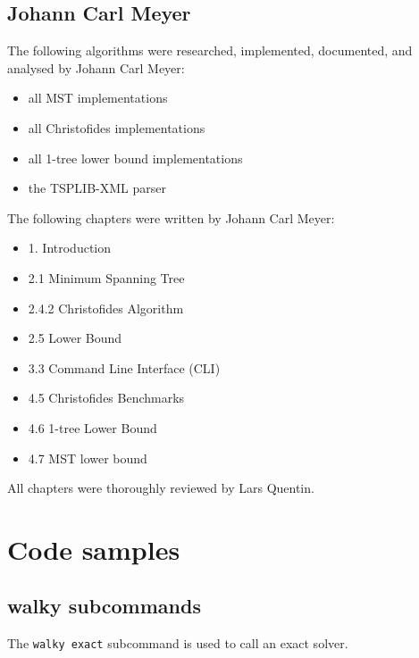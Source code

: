 \subsection{Johann Carl Meyer}
The following algorithms were researched, implemented, documented,
and analysed by Johann Carl Meyer:
\begin{itemize}
  \item all \ac{MST} implementations
  \item all Christofides implementations
  \item all 1-tree lower bound implementations
  \item the TSPLIB-XML parser
\end{itemize}

The following chapters were written by Johann Carl Meyer:
\begin{itemize}
\item 1. Introduction
\item 2.1 Minimum Spanning Tree
\item 2.4.2 Christofides Algorithm
\item 2.5 Lower Bound
\item 3.3 Command Line Interface (CLI)
\item 4.5 Christofides Benchmarks
\item 4.6 1-tree Lower Bound
\item 4.7 MST lower bound
\end{itemize}

All chapters were thoroughly reviewed by Lars Quentin.

\section{Code samples}

\subsection{walky subcommands}

\label{sec:walky_subcommands}

The \texttt{walky exact} subcommand is used to call an exact solver.

